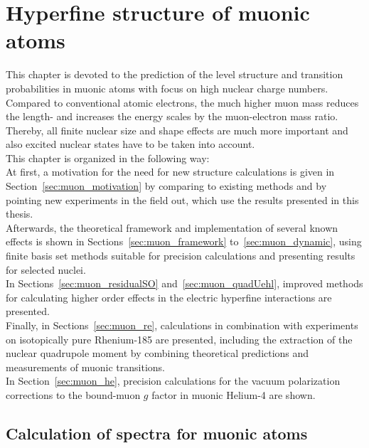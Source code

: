 \chapter{Hyperfine structure of muonic atoms}
\label{ch:muonic_atoms}
This chapter is devoted to the prediction of the level structure and transition probabilities in muonic atoms with focus on high nuclear charge numbers. Compared to conventional atomic electrons, the much higher muon mass reduces the length- and  increases the energy scales by the muon-electron mass ratio. Thereby, all finite nuclear size and shape effects are much more important and also excited nuclear states have to be taken into account.\\
This chapter is organized in the following way:\\
At first, a motivation for the need for new structure calculations is given in Section~\ref{sec:muon_motivation} by comparing to existing methods and by pointing new experiments in the field out, which use the results presented in this thesis.\\
Afterwards, the theoretical framework and implementation of several known effects is shown in Sections~\ref{sec:muon_framework} to~\ref{sec:muon_dynamic}, using finite basis set methods suitable for precision calculations and presenting results for selected nuclei.\\
In Sections~\ref{sec:muon_residualSO} and~\ref{sec:muon_quadUehl}, improved methods for calculating higher order effects in the electric hyperfine interactions are presented.\\
Finally, in Sections~\ref{sec:muon_re}, calculations in combination with experiments on isotopically pure Rhenium-185 are presented, including the extraction of the nuclear quadrupole moment by combining theoretical predictions and measurements of muonic transitions. \\
In Section~\ref{sec:muon_he}, precision calculations for the vacuum polarization corrections to the bound-muon $g$ factor in muonic Helium-4 are shown.

\section{Calculation of spectra for muonic atoms}
